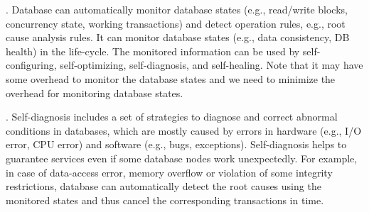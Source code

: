 

. Database can automatically monitor database states (e.g., read/write blocks, concurrency state, working transactions) and detect operation rules, e.g., root cause analysis rules. It can monitor database states (e.g., data consistency, DB health) in the life-cycle. The monitored information can be used by self-configuring, self-optimizing, self-diagnosis, and self-healing. Note that it may have some overhead to monitor the database states and we need to minimize the overhead for monitoring database states. %



. Self-diagnosis includes a set of strategies to diagnose and correct abnormal conditions in databases, which are mostly caused by errors in hardware (e.g., I/O error, CPU error) and software (e.g., bugs, exceptions). Self-diagnosis helps to guarantee services even if some database nodes work unexpectedly. For example, in case of data-access error, memory overflow or violation of some integrity restrictions, database can automatically detect the root causes using the monitored states and thus cancel the corresponding transactions in time. 






